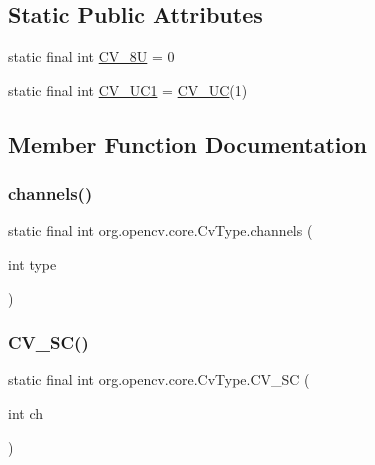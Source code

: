 \subsection*{Static Public Attributes}
\begin{DoxyCompactItemize}
\item 
static final int \mbox{\hyperlink{classorg_1_1opencv_1_1core_1_1_cv_type_a4b13bf91629f350cf25bb7eb528d82d7}{C\+V\+\_\+8U}} = 0
\item 
static final int \mbox{\hyperlink{classorg_1_1opencv_1_1core_1_1_cv_type_a385128a12079659d6b7a7ef4dd63836e}{C\+V\+\_\+U\+C1}} = \mbox{\hyperlink{classorg_1_1opencv_1_1core_1_1_cv_type_ac747e0c4781d8cd6549d7526c8239aa4}{C\+V\+\_\+UC}}(1)
\end{DoxyCompactItemize}


\subsection{Member Function Documentation}
\mbox{\label{classorg_1_1opencv_1_1core_1_1_cv_type_a42dd36ab62b214f3cd845d8b8553de45}} 
\subsubsection{\texorpdfstring{channels()}{channels()}}
{\footnotesize\ttfamily static final int org.\+opencv.\+core.\+Cv\+Type.\+channels (\begin{DoxyParamCaption}\item[{int}]{type }\end{DoxyParamCaption})\hspace{0.3cm}{\ttfamily [static]}}

\mbox{\label{classorg_1_1opencv_1_1core_1_1_cv_type_aae48c342f211fd13ad3b4318e5c3f800}} 
\subsubsection{\texorpdfstring{C\+V\+\_\+S\+C()}{CV\_16SC()}}
{\footnotesize\ttfamily static final int org.\+opencv.\+core.\+Cv\+Type.\+C\+V\+\_\+SC (\begin{DoxyParamCaption}\item[{int}]{ch }\end{DoxyParamCaption})\hspace{0.3cm}{\ttfamily [static]}}

